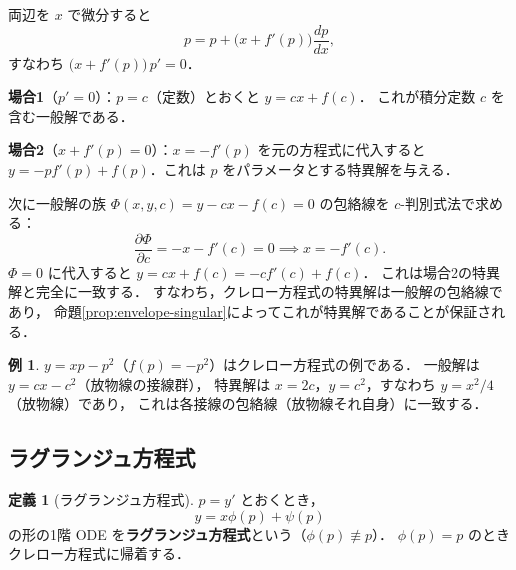 \documentclass[dvipdfmx,a4paper,12pt]{jsarticle}
\makeatletter
\newcommand{\uref}[1]{\hyperref[#1]{\textcolor{TiffanyBlue}{\underline{\ref*{#1}}}}}
\theoremstyle{definition}
\newtheorem{definition}[theorem]{定義}
\newtheorem{example}[theorem]{例}
\renewcommand{\proofname}{証明}
\renewenvironment{proof}[1][\proofname]{%
  \par\pushQED{\qed}%
  \normalfont \topsep6\p@\@plus6\p@\relax
  \trivlist
  \item[\hskip\labelsep\bfseries#1\@addpunct{.}]\ignorespaces
}{%
  \popQED\endtrivlist\@endpefalse
}
\makeatother
\begin{document}
\begin{proof}
    両辺を $x$ で微分すると
    \begin{equation*}
        p = p + \bigl(x + f'(p)\bigr)\frac{dp}{dx},
    \end{equation*}
    すなわち $\bigl(x+f'(p)\bigr)\,p'=0$．

    \textbf{場合1}（$p'=0$）：$p=c$（定数）とおくと $y=cx+f(c)$．
    これが積分定数 $c$ を含む一般解である．

    \textbf{場合2}（$x+f'(p)=0$）：$x=-f'(p)$ を元の方程式に代入すると
    $y=-pf'(p)+f(p)$．これは $p$ をパラメータとする特異解を与える．

    次に一般解の族 $\Phi(x,y,c)=y-cx-f(c)=0$ の包絡線を $c$-判別式法で求める：
    \begin{equation*}
        \frac{\partial\Phi}{\partial c} = -x - f'(c) = 0
        \implies x = -f'(c).
    \end{equation*}
    $\Phi=0$ に代入すると $y = cx + f(c) = -cf'(c) + f(c)$．
    これは場合2の特異解と完全に一致する．
    すなわち，クレロー方程式の特異解は一般解の包絡線であり，
    命題\uref{prop:envelope-singular}によってこれが特異解であることが保証される．
\end{proof}

\begin{example}
    $y = xp - p^2$（$f(p)=-p^2$）はクレロー方程式の例である．
    一般解は $y = cx - c^2$（放物線の接線群），
    特異解は $x = 2c$，$y = c^2$，すなわち $y = x^2/4$（放物線）であり，
    これは各接線の包絡線（放物線それ自身）に一致する．
\end{example}

\subsection{ラグランジュ方程式}

\begin{definition}[ラグランジュ方程式]
    $p=y'$ とおくとき，
    \begin{equation*}
        y = x\phi(p) + \psi(p)
    \end{equation*}
    の形の1階 ODE を\textbf{ラグランジュ方程式}という（$\phi(p)\not\equiv p$）．
    $\phi(p)=p$ のときクレロー方程式に帰着する．
\end{definition}
\end{document}
